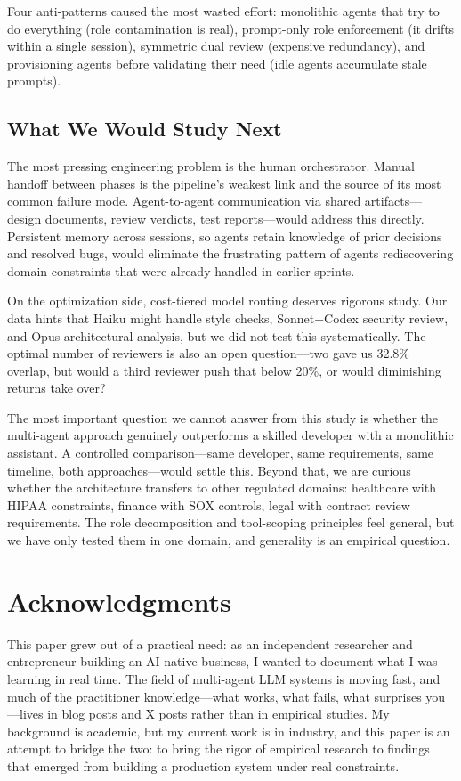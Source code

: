 \documentclass[11pt,a4paper]{article}
\begin{document}
Four anti-patterns caused the most wasted effort: monolithic agents that try to do everything (role contamination is real), prompt-only role enforcement (it drifts within a single session), symmetric dual review (expensive redundancy), and provisioning agents before validating their need (idle agents accumulate stale prompts).

\subsection{What We Would Study Next}

The most pressing engineering problem is the human orchestrator. Manual handoff between phases is the pipeline's weakest link and the source of its most common failure mode. Agent-to-agent communication via shared artifacts---design documents, review verdicts, test reports---would address this directly. Persistent memory across sessions, so agents retain knowledge of prior decisions and resolved bugs, would eliminate the frustrating pattern of agents rediscovering domain constraints that were already handled in earlier sprints.

On the optimization side, cost-tiered model routing deserves rigorous study. Our data hints that Haiku might handle style checks, Sonnet+Codex security review, and Opus architectural analysis, but we did not test this systematically. The optimal number of reviewers is also an open question---two gave us 32.8\% overlap, but would a third reviewer push that below 20\%, or would diminishing returns take over?

The most important question we cannot answer from this study is whether the multi-agent approach genuinely outperforms a skilled developer with a monolithic assistant. A controlled comparison---same developer, same requirements, same timeline, both approaches---would settle this. Beyond that, we are curious whether the architecture transfers to other regulated domains: healthcare with HIPAA constraints, finance with SOX controls, legal with contract review requirements. The role decomposition and tool-scoping principles feel general, but we have only tested them in one domain, and generality is an empirical question.

\section*{Acknowledgments}

This paper grew out of a practical need: as an independent researcher and entrepreneur building an AI-native business, I wanted to document what I was learning in real time. The field of multi-agent LLM systems is moving fast, and much of the practitioner knowledge---what works, what fails, what surprises you---lives in blog posts and X posts rather than in empirical studies. My background is academic, but my current work is in industry, and this paper is an attempt to bridge the two: to bring the rigor of empirical research to findings that emerged from building a production system under real constraints.
\end{document}
